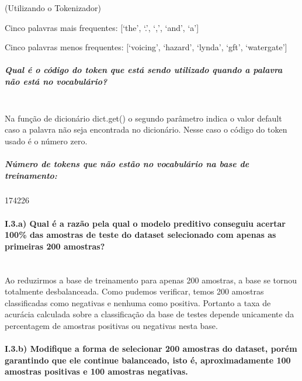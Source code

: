 \documentclass[11pt]{article}
\begin{document}
(Utilizando o Tokenizador)

Cinco palavras mais frequentes: {[}`the', `.', `,', `and', `a'{]}

Cinco palavras menos frequentes: {[}`voicing', `hazard', `lynda', `gft',
`watergate'{]}

\subparagraph{Qual é o código do token que está sendo utilizado quando a
palavra não está no
vocabulário?}\label{qual-uxe9-o-cuxf3digo-do-token-que-estuxe1-sendo-utilizado-quando-a-palavra-nuxe3o-estuxe1-no-vocabuluxe1rio}\mbox{} \\

Na função de dicionário dict.get() o segundo parâmetro indica o valor
default caso a palavra não seja encontrada no dicionário. Nesse caso o
código do token usado é o número zero.

\subparagraph{Número de tokens que não estão no vocabulário na base de
treinamento:}\label{nuxfamero-de-tokens-que-nuxe3o-estuxe3o-no-vocabuluxe1rio-na-base-de-treinamento}

174226

    \paragraph{I.3.a) Qual é a razão pela qual o modelo preditivo conseguiu
acertar 100\% das amostras de teste do dataset selecionado com apenas as
primeiras 200
amostras?}\label{i.3.a-qual-uxe9-a-razuxe3o-pela-qual-o-modelo-preditivo-conseguiu-acertar-100-das-amostras-de-teste-do-dataset-selecionado-com-apenas-as-primeiras-200-amostras}\mbox{} \\

Ao reduzirmos a base de treinamento para apenas 200 amostras, a base se
tornou totalmente desbalanceada. Como pudemos verificar, temos 200
amostras classificadas como negativas e nenhuma como positiva. Portanto
a taxa de acurácia calculada sobre a classificação da base de testes
depende unicamente da percentagem de amostras positivas ou negativas
nesta base.

\paragraph{I.3.b) Modifique a forma de selecionar 200 amostras do
dataset, porém garantindo que ele continue balanceado, isto é,
aproximadamente 100 amostras positivas e 100 amostras
negativas.}\label{i.3.b-modifique-a-forma-de-selecionar-200-amostras-do-dataset-poruxe9m-garantindo-que-ele-continue-balanceado-isto-uxe9-aproximadamente-100-amostras-positivas-e-100-amostras-negativas.}\mbox{} \\
\end{document}
